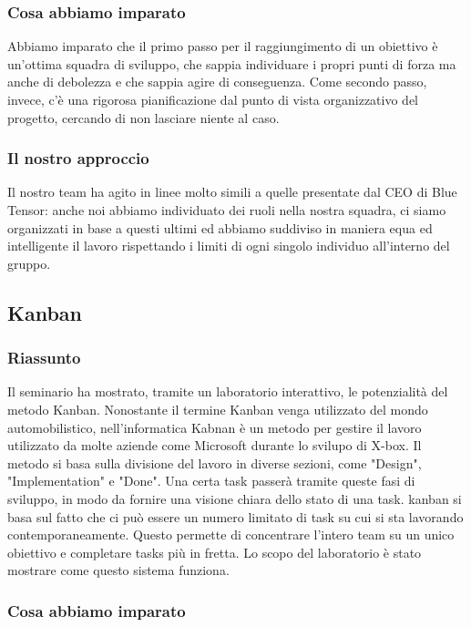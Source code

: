 \documentclass{report}
\begin{document}
\subsubsection*{Cosa abbiamo imparato}
Abbiamo imparato che il primo passo per il raggiungimento di un obiettivo è un'ottima squadra di sviluppo, che sappia individuare i propri punti di forza ma anche di debolezza e che sappia agire di conseguenza. Come secondo passo, invece, c'è una rigorosa pianificazione dal punto di vista organizzativo del progetto, cercando di non lasciare niente al caso.

\subsubsection*{Il nostro approccio}
Il nostro team ha agito in linee molto simili a quelle presentate dal CEO di Blue Tensor: anche noi abbiamo individuato dei ruoli nella nostra squadra, ci siamo organizzati in base a questi ultimi ed abbiamo suddiviso in maniera equa ed intelligente il lavoro rispettando i limiti di ogni singolo individuo all'interno del gruppo.


\subsection{Kanban}
\subsubsection*{Riassunto}

Il seminario ha mostrato, tramite un laboratorio interattivo, le potenzialità del metodo Kanban. Nonostante il termine Kanban venga utilizzato del mondo automobilistico, nell'informatica Kabnan è un metodo per gestire il lavoro utilizzato da molte aziende come Microsoft durante lo svilupo di X-box. Il metodo si basa sulla divisione del lavoro in diverse sezioni, come "Design", "Implementation" e "Done". Una certa task passerà tramite queste fasi di sviluppo, in modo da fornire una visione chiara dello stato di una task. kanban si basa sul fatto che ci può essere un numero limitato di task su cui si sta lavorando contemporaneamente. Questo permette di concentrare l'intero team su un unico obiettivo e completare tasks più in fretta. Lo scopo del laboratorio è stato mostrare come questo sistema funziona.

\subsubsection*{Cosa abbiamo imparato}
\end{document}
